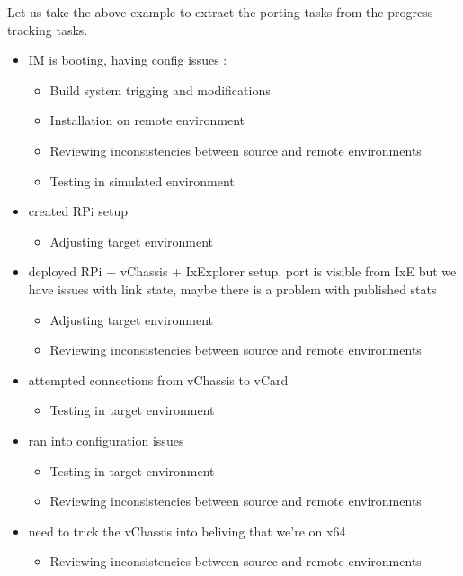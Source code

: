 Let us take the above example to extract the porting tasks from the progress
tracking tasks.

\begin{itemize}
\item IM is booting, having config issues :
    \begin{itemize}
    \item Build system trigging and modifications
    \item Installation on remote environment
    \item Reviewing inconsistencies between source and remote environments
    \item Testing in simulated environment
    \end{itemize}

\item created RPi setup
    \begin{itemize}
    \item Adjusting target environment
    \end{itemize}

\item deployed RPi + vChassis + IxExplorer setup, port is visible from IxE but
we have issues with link state, maybe there is a problem with published stats
    \begin{itemize}
    \item Adjusting target environment
    \item Reviewing inconsistencies between source and remote environments
    \end{itemize}

\item attempted connections from vChassis to vCard
    \begin{itemize}
    \item Testing in target environment
    \end{itemize}

\item ran into configuration issues
    \begin{itemize}
    \item Testing in target environment
    \item Reviewing inconsistencies between source and remote environments
    \end{itemize}

\item need to trick the vChassis into beliving that we're on x64
    \begin{itemize}
    \item Reviewing inconsistencies between source and remote environments
    \end{itemize}
\end{itemize}

